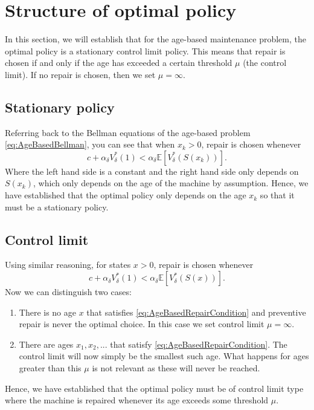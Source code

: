 \section{Structure of optimal policy}
In this section, we will establish that for the age-based maintenance problem, the optimal policy is a stationary control limit policy.
This means that repair is chosen if and only if the age has exceeded a certain threshold $\mu$ (the control limit).
If no repair is chosen, then we set $\mu=\infty$.

\subsection{Stationary policy}\label{section:AgeBasedStationaryPolicy}
Referring back to the Bellman equations of the age-based problem \eqref{eq:AgeBasedBellman}, you can see that when $x_k>0$, repair is chosen whenever
\[ c+\alpha_\delta V^*_\delta(1) <\alpha_\delta \mathbb{E}[V^*_\delta(S(x_k))]. \]
Where the left hand side is a constant and the right hand side only depends on $S(x_k)$, which only depends on the age of the machine by assumption.
Hence, we have established that the optimal policy only depends on the age $x_k$ so that it must be a stationary policy.

\subsection{Control limit}
Using similar reasoning, for states $x>0$, repair is chosen whenever
\begin{equation}\label{eq:AgeBasedRepairCondition}
 c+\alpha_\delta V^*_\delta(1) <\alpha_\delta \mathbb{E}[V^*_\delta(S(x))]. 
 \end{equation}
Now we can distinguish two cases:
\begin{enumerate}
	\item There is no age $x$ that satisfies \eqref{eq:AgeBasedRepairCondition} and preventive repair is never the optimal choice.
	In this case we set control limit $\mu=\infty$.
	\item There are ages $x_1,x_2,...$ that satisfy \eqref{eq:AgeBasedRepairCondition}.
	The control limit will now simply be the smallest such age.
	What happens for ages greater than this $\mu$ is not relevant as these will never be reached.
\end{enumerate}
Hence, we have established that the optimal policy must be of control limit type where the machine is repaired whenever its age exceeds some threshold $\mu$.